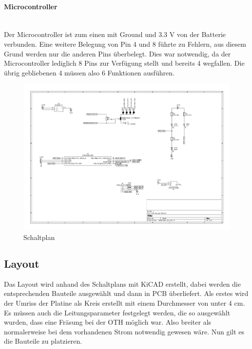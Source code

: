 \documentclass[a4paper,
DIV=13,
12pt,
BCOR=10mm,
department=FakEI,
parskip=half,
automark,
]{article}
\begin{document}
\paragraph{Microcontroller} $~$ \\

Der Microcontroller ist zum einen mit Ground und 3.3 V von der Batterie verbunden. Eine weitere Belegung von Pin 4 und 8 führte zu Fehlern, aus diesem Grund werden nur die anderen Pins überbelegt. Dies war notwendig, da der Microcontroller lediglich 8 Pins zur Verfügung stellt und bereits 4 wegfallen. Die übrig gebliebenen 4 müssen also 6 Funktionen ausführen. 

\begin{figure}[!hbpt]
 \begin{center} \includegraphics[width=1.4\textwidth,angle=90]{Schaltplan.pdf}
 \caption{Schaltplan}
 \label{fig:Schaltplan}
  \end{center}
\end{figure}

\newpage

\subsection{Layout}

Das Layout wird anhand des Schaltplans mit KiCAD erstellt, dabei werden die entsprechenden Bauteile ausgewählt und dann in PCB überliefert. Als erstes wird der Umriss der Platine als Kreis erstellt mit einem Durchmesser von unter 4 cm. Es müssen auch die Leitungsparameter festgelegt werden, die so ausgewählt wurden, dass eine Fräsung bei der OTH möglich war. Also breiter als normalerweise bei dem vorhandenen Strom notwendig gewesen wäre. Nun gilt es die Bauteile zu platzieren. 
\end{document}
